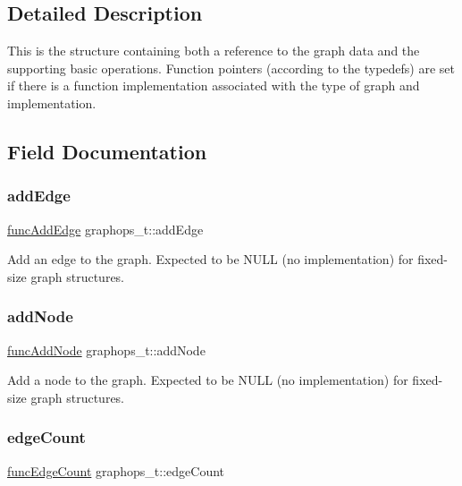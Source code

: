 \subsection{Detailed Description}
This is the structure containing both a reference to the graph data and the supporting basic operations. Function pointers (according to the typedefs) are set if there is a function implementation associated with the type of graph and implementation. 

\subsection{Field Documentation}
\mbox{\label{structgraphops__t_af9a74b6643b49f7799dfa78f4824aa22}} 
\subsubsection{\texorpdfstring{add\+Edge}{addEdge}}
{\footnotesize\ttfamily \hyperlink{graphops_8h_a7db3802ca9110f9f9095250ed85a39a5}{func\+Add\+Edge} graphops\+\_\+t\+::add\+Edge}

Add an edge to the graph. Expected to be N\+U\+LL (no implementation) for fixed-\/size graph structures. \mbox{\label{structgraphops__t_aa1fdab76a86ab2889415964b51f1738f}} 
\subsubsection{\texorpdfstring{add\+Node}{addNode}}
{\footnotesize\ttfamily \hyperlink{graphops_8h_ac3a2b8cb9dcf1f1a8cd4cb5f819e245a}{func\+Add\+Node} graphops\+\_\+t\+::add\+Node}

Add a node to the graph. Expected to be N\+U\+LL (no implementation) for fixed-\/size graph structures. \mbox{\label{structgraphops__t_a5db6e2eee59ada7705fb54bf5f6b9ee1}} 
\subsubsection{\texorpdfstring{edge\+Count}{edgeCount}}
{\footnotesize\ttfamily \hyperlink{graphops_8h_a9c7f99c0f38ebae08cb49e70ffe91fa1}{func\+Edge\+Count} graphops\+\_\+t\+::edge\+Count}

